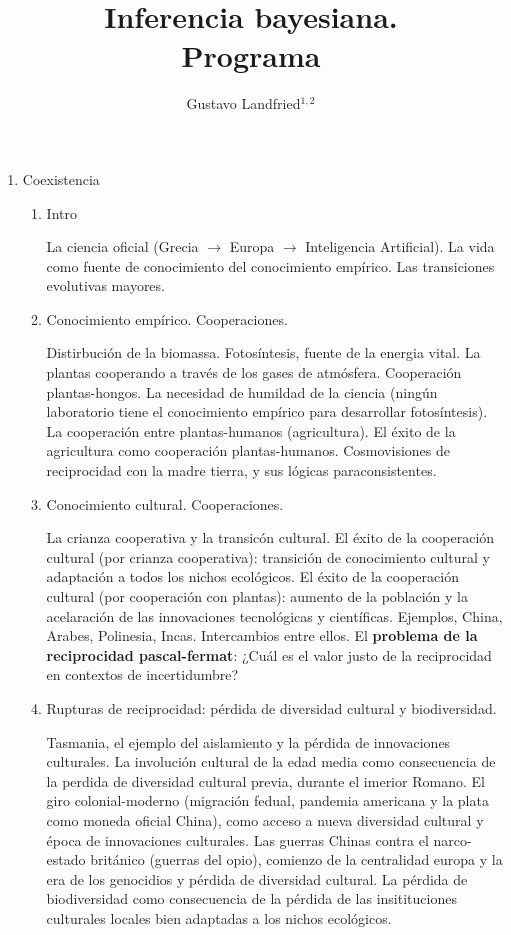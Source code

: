 \documentclass[10pt]{article}
\title{\huge Inferencia bayesiana.  \\  \LARGE Programa}
\author{Gustavo Landfried$^{1,2}$}
\affil{\small 1. Universidad de Buenos Aires. Facultad de Ciencias Exactas y Naturales. Departamento de Computaci\'on. Buenos Aires, Argentina}
\affil{\small 2. Bayes de las Provincias Unidas del Sur.}
\affil[]{Correspondencia: \url{bayesdelsur@gmail.com}}
\begin{document}
\maketitle

\begin{enumerate}
\item Coexistencia

\begin{enumerate}
\item Intro

La ciencia oficial (Grecia $\rightarrow$ Europa $\rightarrow$ Inteligencia Artificial).
La vida como fuente de conocimiento del conocimiento empírico.
Las transiciones evolutivas mayores.

\item Conocimiento empírico. Cooperaciones. 

Distirbución de la biomassa.
Fotosíntesis, fuente de la energia vital.
La plantas cooperando a través de los gases de atmósfera.
Cooperación plantas-hongos.
La necesidad de humildad de la ciencia (ningún laboratorio tiene el conocimiento empírico para desarrollar fotosíntesis).
La cooperación entre plantas-humanos (agricultura).
El éxito de la agricultura como cooperación plantas-humanos.
Cosmovisiones de reciprocidad con la madre tierra, y sus lógicas paraconsistentes.

\item Conocimiento cultural. Cooperaciones.

La crianza cooperativa y la transicón cultural.
El éxito de la cooperación cultural (por crianza cooperativa): transición de conocimiento cultural y adaptación a todos los nichos ecológicos.
El éxito de la cooperación cultural (por cooperación con plantas): aumento de la población y la acelaración de las innovaciones tecnológicas y científicas.
Ejemplos, China, Arabes, Polinesia, Incas. Intercambios entre ellos.
El \textbf{problema de la reciprocidad pascal-fermat}: ¿Cuál es el valor justo de la reciprocidad en contextos de incertidumbre?

\item Rupturas de reciprocidad: pérdida de diversidad cultural y biodiversidad.

Tasmania, el ejemplo del aislamiento y la pérdida de innovaciones culturales.
La involución cultural de la edad media como consecuencia de la perdida de diversidad cultural previa, durante el imerior Romano.
El giro colonial-moderno (migración fedual, pandemia americana y la plata como moneda oficial China), como acceso a nueva diversidad cultural y época de innovaciones culturales.
Las guerras Chinas contra el narco-estado británico (guerras del opio), comienzo de la centralidad europa y la era de los genocidios y pérdida de diversidad cultural.
La pérdida de biodiversidad como consecuencia de la pérdida de las insitituciones culturales locales bien adaptadas a los nichos ecológicos.


\end{enumerate}
\end{enumerate}
\end{document}
